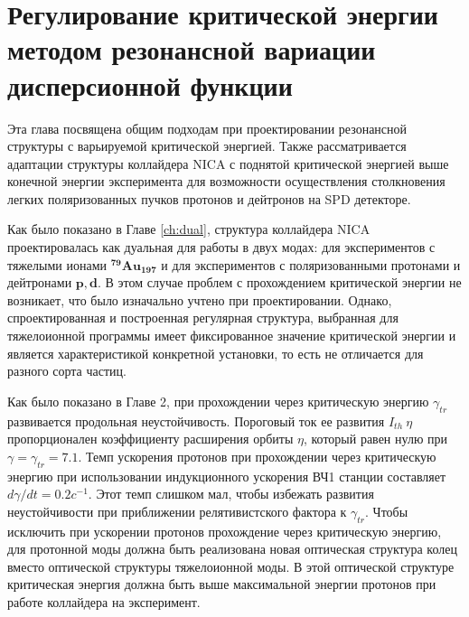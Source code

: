 
	\chapter{Регулирование критической энергии методом резонансной вариации дисперсионной функции}\label{ch:resonant}

\par Эта глава посвящена общим подходам при проектировании резонансной структуры с варьируемой критической энергией. Также рассматривается адаптации структуры коллайдера NICA с поднятой критической энергией выше конечной энергии эксперимента для возможности осуществления столкновения легких поляризованных пучков протонов и дейтронов на SPD детекторе.

\begin{comment}
В эксперименте по столкновению тяжелых ионов золота c максимальной энергией $E_{exp}=4.5$ ГэВ/нуклон критическая энергия магнитооптической структуры коллайдера составляет $E_{tr}^{Au-Au}=5.7$\ ГэВ ($\gamma_{tr}^{Au-Au}=7.1$). Такое значение критической энергии было достигнуто выбором частоты бетатронных колебаний в горизонтальной плоскости $\nu_x\approx\gamma_{tr}^{Au}>\gamma_{max}^{Au}\approx7.1$, которая  при условии регулярности структуры арок, состоящих из одинаковых ячеек ФОДО, должна быть больше максимального значения фактора Лоренца во всем интервале энергий.
\end{comment}

\par Как было показано в Главе \ref{ch:dual}, структура коллайдера NICA проектировалась как дуальная для работы в двух модах: для экспериментов с тяжелыми ионами $^{\mathbf{79}}{\mathbf{Au}}_{\mathbf{197}}$ и для экспериментов с поляризованными протонами и дейтронами $\mathbf{p, d}$. В этом случае проблем с прохождением критической энергии не возникает, что было изначально учтено при проектировании. Однако, спроектированная и построенная регулярная структура, выбранная для тяжелоионной программы имеет фиксированное значение критической энергии и является характеристикой конкретной установки, то есть не отличается для разного сорта частиц.

\par Как было показано в Главе 2, при прохождении через критическую энергию $\gamma_{tr}$ развивается продольная неустойчивость. Пороговый ток ее развития $I_{th}~\eta$ пропорционален коэффициенту расширения орбиты $\eta$, который равен нулю при  $\gamma=\gamma_{tr}=7.1$. Темп ускорения протонов при прохождении через критическую энергию при использовании индукционного ускорения ВЧ1 станции составляет $d\gamma/dt=0.2c^{-1}$. Этот темп слишком мал, чтобы избежать развития неустойчивости при приближении релятивистского фактора к $\gamma_{tr}$. Чтобы исключить при ускорении протонов прохождение через критическую энергию, для протонной моды должна быть реализована новая оптическая структура колец вместо оптической структуры тяжелоионной моды. В этой оптической структуре критическая энергия должна быть выше максимальной энергии протонов при работе коллайдера на эксперимент.

